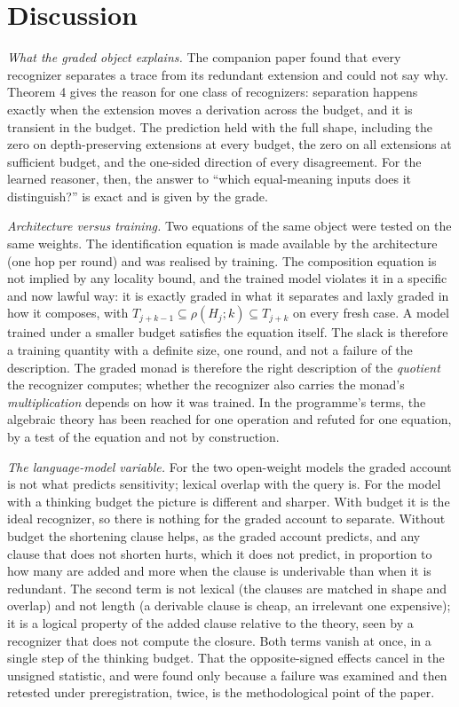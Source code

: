 \section{Discussion}\label{discussion}

\emph{What the graded object explains.} The companion paper found that every recognizer separates a trace from its redundant extension and could not say why. Theorem 4 gives the reason for one class of recognizers: separation happens exactly when the extension moves a derivation across the budget, and it is transient in the budget. The prediction held with the full shape, including the zero on depth-preserving extensions at every budget, the zero on all extensions at sufficient budget, and the one-sided direction of every disagreement. For the learned reasoner, then, the answer to ``which equal-meaning inputs does it distinguish?'' is exact and is given by the grade.

\emph{Architecture versus training.} Two equations of the same object were tested on the same weights. The identification equation is made available by the architecture (one hop per round) and was realised by training. The composition equation is not implied by any locality bound, and the trained model violates it in a specific and now lawful way: it is exactly graded in what it separates and laxly graded in how it composes, with \(T_{j+k-1}\subseteq\rho(H_j;k)\subseteq T_{j+k}\) on every fresh case. A model trained under a smaller budget satisfies the equation itself. The slack is therefore a training quantity with a definite size, one round, and not a failure of the description. The graded monad is therefore the right description of the \emph{quotient} the recognizer computes; whether the recognizer also carries the monad's \emph{multiplication} depends on how it was trained. In the programme's terms, the algebraic theory has been reached for one operation and refuted for one equation, by a test of the equation and not by construction.

\emph{The language-model variable.} For the two open-weight models the graded account is not what predicts sensitivity; lexical overlap with the query is. For the model with a thinking budget the picture is different and sharper. With budget it is the ideal recognizer, so there is nothing for the graded account to separate. Without budget the shortening clause helps, as the graded account predicts, and any clause that does not shorten hurts, which it does not predict, in proportion to how many are added and more when the clause is underivable than when it is redundant. The second term is not lexical (the clauses are matched in shape and overlap) and not length (a derivable clause is cheap, an irrelevant one expensive); it is a logical property of the added clause relative to the theory, seen by a recognizer that does not compute the closure. Both terms vanish at once, in a single step of the thinking budget. That the opposite-signed effects cancel in the unsigned statistic, and were found only because a failure was examined and then retested under preregistration, twice, is the methodological point of the paper.

